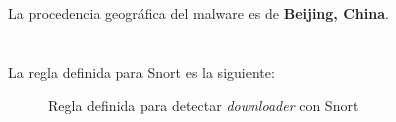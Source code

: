 \documentclass[10pt,a4paper]{article}
\begin{document}
La procedencia geográfica del malware es de \textbf{Beijing, China}.

\pagebreak

\section{}

\subsection{}
La regla definida para Snort es la siguiente:

\begin{figure}[htpb]
	
    \caption{Regla definida para detectar \textit{downloader} con Snort}
    \label{fig:rule}
\end{figure}
\end{document}
